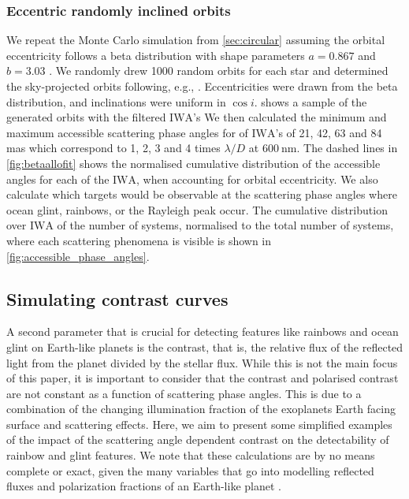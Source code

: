 \documentclass[
    usenatbib,
]{mnras}
\newcommand{\IWA}{\ensuremath{\mathrm{IWA}}}
\begin{document}
\subsubsection{Eccentric randomly inclined orbits}
\label{sec:eccentric}
We repeat the Monte Carlo simulation from \cref{sec:circular} assuming the orbital eccentricity follows a beta distribution with shape parameters $a=0.867$ and $b=3.03$ \citep{2013MNRAS.434L..51K}. 
%
We randomly drew 1000 random orbits for each star and determined the sky-projected orbits following, e.g., \cite{2010exop.book...15M}. Eccentricities were drawn from the beta distribution, and inclinations were uniform in $\cos i$.  shows a sample of the generated orbits with the filtered \IWA{}'s
%
%
We then calculated the minimum and maximum accessible scattering phase angles for of \IWA{}'s of 21, 42, 63 and 84 mas which correspond to 1, 2, 3 and 4 times $\lambda / D$ at $\SI{600}{\nano\meter}$.
%
The dashed lines in \cref{fig:betaallofit} shows the normalised cumulative distribution of the accessible angles for each of the \IWA, when accounting for orbital eccentricity.
%
We also calculate which targets would be observable at the scattering phase angles where ocean glint, rainbows, or the Rayleigh peak occur.
%
The cumulative distribution over \IWA{} of the number of systems, normalised to the total number of systems, where each scattering phenomena is visible is shown in \cref{fig:accessible_phase_angles}.
%
 
\subsection{Simulating contrast curves}

A second parameter that is crucial for detecting features like rainbows and ocean glint on Earth-like planets is the contrast, that is, the relative flux of the reflected light from the planet divided by the stellar flux. 
%
While this is not the main focus of this paper, it is important to consider that the contrast and polarised contrast are not constant as a function of scattering phase angles.
%
This is due to a combination of the changing illumination fraction of the exoplanets Earth facing surface and scattering effects.
%
Here, we aim to present some simplified examples of the impact of the scattering angle dependent contrast on the detectability of rainbow and glint features. 
%
We note that these calculations are by no means complete or exact, given the many variables that go into modelling reflected fluxes and polarization fractions of an Earth-like planet \citep{ treesandstam2019,trees2022}.
\end{document}
